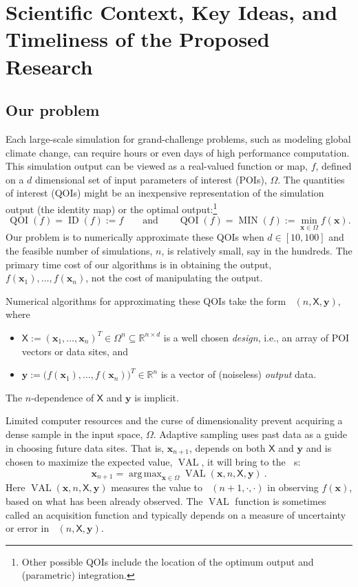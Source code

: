 \documentclass[11pt]{NSFamsart}
\DeclareMathOperator*{\argmax}{arg\,max}
\DeclareMathOperator{\QOI}{QOI}
\DeclareMathOperator{\APP}{\widehat{\QOI}}
\DeclareMathOperator{\VAL}{VAL}
\DeclareMathOperator{\MIN}{MIN}
\DeclareMathOperator{\ID}{ID}
\newcommand{\reals}{{\mathbb{R}}}
\newcommand{\mX}{\mathsf{X}}
\newcommand{\bx}{{\boldsymbol{x}}}
\newcommand{\by}{{\boldsymbol{y}}}
\begin{document}
\section{Scientific Context, Key Ideas, and Timeliness of the Proposed Research}
\subsection{Our problem}

Each large-scale simulation for grand-challenge problems, such as modeling global climate change, can require hours or even days of high performance computation.  This simulation output can be viewed as a real-valued function or map, $f$, defined on a $d$ dimensional set of input parameters of interest (POIs), $\Omega$.  The quantities of interest (QOIs) might be 
an inexpensive representation of the simulation output (the identity map) or the optimal output:\footnote{Other possible QOIs include the location of the optimum output and (parametric) integration.}  
\begin{equation} \label{eq:ourQOIs}
    \QOI(f) = \ID(f) := f \qquad \text{and} \qquad \QOI(f) = \MIN(f) := \min_{\bx \in \Omega} f(\bx).
\end{equation}
Our problem is to numerically approximate these QOIs when $d \in [10, 100]$ and the feasible number of simulations, $n$, is relatively small, say in the hundreds.  The primary time cost of our algorithms is in obtaining the output, $f(\bx_1), \ldots, f(\bx_n)$, not the cost of manipulating the output.

Numerical algorithms for approximating these QOIs take the form $\APP(n,\mX,\by)$, where 
\begin{itemize}
    \item $\mX := (\bx_1, \ldots, \bx_n)^T \in \Omega^{n} \subseteq \reals^{n \times d}$ is a well chosen \emph{design}, i.e., an array of POI vectors or data sites, and
    
    \item $\by := \bigl(f(\bx_1), \ldots, f(\bx_n) \bigr)^T \in \reals^n$ is a vector of (noiseless) \emph{output} data.
\end{itemize}   
The $n$-dependence of $\mX$ and $\by$ is implicit.  

Limited computer resources and the curse of dimensionality prevent acquiring a dense sample in the input space, $\Omega$. Adaptive sampling uses past data as a guide in choosing future data sites.   That is, $\bx_{n+1}$, depends on both $\mX$ and  $\by$ and is chosen to maximize the expected value, $\VAL$, it will bring to the $\APP$s:
\begin{equation} \label{eq:nextsample}
    \bx_{n+1} = \argmax_{\bx \in \Omega} \VAL(\bx,n,\mX, \by)~.
\end{equation}
Here $\VAL(\bx,n,\mX, \by)$ measures the value to $\APP(n+1,\cdot,\cdot)$ in observing $f(\bx)$, based on what has been already observed.  The $\VAL$ function is sometimes called an acquisition function and  typically depends on a measure of uncertainty or error in $\APP(n,\mX,\by)$.
\end{document}
